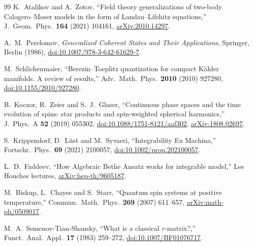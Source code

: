 \begin{thebibliography}{99}
K.~Atalikov and A.~Zotov,
``Field theory generalizations of two-body Calogero--Moser models in the form of Landau--Lifshitz equations,''
J.~Geom.~Phys.~\textbf{164} (2021) 104161,
\href{https://arxiv.org/abs/2010.14297}{arXiv:2010.14297}.

A.~M.~Perelomov,
\emph{Generalized Coherent States and Their Applications},
Springer, Berlin (1986),
\href{https://doi.org/10.1007/978-3-642-61629-7}{doi:10.1007/978-3-642-61629-7}.

M.~Schlichenmaier,
``Berezin--Toeplitz quantization for compact K\"ahler manifolds. A review of results,''
Adv.~Math.~Phys.~\textbf{2010} (2010) 927280,
\href{https://doi.org/10.1155/2010/927280}{doi:10.1155/2010/927280}.

B.~Koczor, R.~Zeier and S.~J.~Glaser,
``Continuous phase spaces and the time evolution of spins: star products and
spin-weighted spherical harmonics,''
J.~Phys.~A \textbf{52} (2019) 055302,
\href{https://doi.org/10.1088/1751-8121/aaf302}{doi:10.1088/1751-8121/aaf302},
\href{https://arxiv.org/abs/1808.02697}{arXiv:1808.02697}.

S.~Krippendorf, D.~L\"ust and M.~Syvaeri,
``Integrability Ex Machina,''
Fortschr.~Phys.~\textbf{69} (2021) 2100057,
\href{https://doi.org/10.1002/prop.202100057}{doi:10.1002/prop.202100057}.

L.~D.~Faddeev,
``How Algebraic Bethe Ansatz works for integrable model,''
Les Houches lectures,
\href{https://arxiv.org/abs/hep-th/9605187}{arXiv:hep-th/9605187}.

M.~Biskup, L.~Chayes and S.~Starr,
``Quantum spin systems at positive temperature,''
Commun.~Math.~Phys.~\textbf{269} (2007) 611--657,
\href{https://arxiv.org/abs/math-ph/0509017}{arXiv:math-ph/0509017}.

M.~A.~Semenov-Tian-Shansky,
``What is a classical $r$-matrix?,''
Funct.~Anal.~Appl.~\textbf{17} (1983) 259--272,
\href{https://doi.org/10.1007/BF01076717}{doi:10.1007/BF01076717}.

\end{thebibliography}
